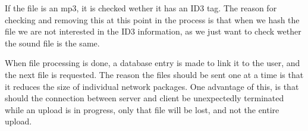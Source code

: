 If the file is an mp3, it is checked wether it has an ID3 tag\cite{ONeill10}. The reason for checking and removing this at this point in
the process is that when we hash the file we are not interested in the ID3 information, as we just want to check wether the sound file is
the same.

When file processing is done, a database entry is made to link it to the user, and the next file is requested. The reason the files
should be sent one at a time is that it reduces the size of individual network packages. One advantage of this, is that should the
connection between server and client be unexpectedly terminated while an upload is in progress, only that file will be lost, and not the
entire upload.